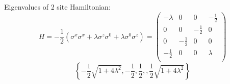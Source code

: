 \documentclass[10pt,a4paper]{article}
\begin{document}
Eigenvalues of 2 site Hamiltonian:
\begin{equation}
	H=-\frac{1}{2} \left(\sigma^{x} \sigma^{x}+\lambda\sigma^{z} \sigma^0+\lambda\sigma^0\sigma^{z}\right) =
	\left(
	\begin{array}{cccc}
		-\lambda  & 0 & 0 & -\frac{1}{2} \\
		0 & 0 & -\frac{1}{2} & 0 \\
		0 & -\frac{1}{2} & 0 & 0 \\
		-\frac{1}{2} & 0 & 0 & \lambda  \\
	\end{array}
	\right)
\end{equation}
\begin{equation}
	\left\{-\frac{1}{2} \sqrt{1+4 \lambda ^2},-\frac{1}{2},\frac{1}{2},,\frac{1}{2} \sqrt{1+4 \lambda ^2}\right\}
\end{equation}
\end{document}
